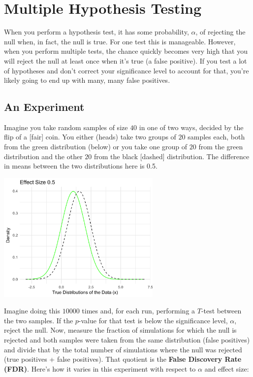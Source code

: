 
\section{Multiple Hypothesis Testing}

When you perform a hypothesis test, it has some probability, $\alpha$, of rejecting the null when, in fact, the null is true. For one test this is manageable. However, when you perform multiple tests, the chance quickly becomes very high that you will reject the null at least once when it's true (a false positive). If you test a lot of hypotheses and don't correct your significance level to account for that, you're likely going to end up with many, many false positives.

\subsection{An Experiment}

Imagine you take random samples of size $40$ in one of two ways, decided by the flip of a [fair] coin. You either (heads) take two groups of $20$ samples each, both from the green distribution (below) or you take one group of $20$ from the green distribution and the other $20$ from the black [dashed] distribution. The difference in means between the two distributions here is 0.5. 

\begin{center}
\includegraphics[width=0.6\textwidth]{img/multiple-hypothesis-example-2a.png}
\end{center}

Imagine doing this $10000$ times and, for each run, performing a $T$-test between the two samples. If the $p$-value for that test is below the significance level, $\alpha$, reject the null. Now, measure the fraction of simulations for which the null is rejected and both samples were taken from the same distribution (false positives) and divide that by the total number of simulations where the null was rejected (true positives + false positives). That quotient is the \textbf{False Discovery Rate (FDR)}. Here's how it varies in this experiment with respect to $\alpha$ and effect size: 

